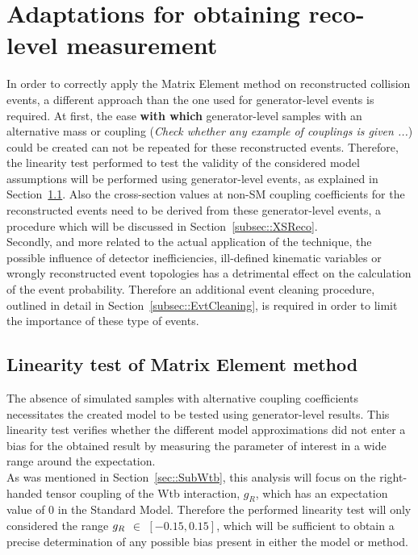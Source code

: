 \section{Adaptations for obtaining reco-level measurement} \label{sec::RecoAdapt}
In order to correctly apply the Matrix Element method on reconstructed collision events, a different approach than the one used for generator-level events is required.
At first, the ease \textbf{with which} generator-level samples with an alternative mass or coupling (\textit{Check whether any example of couplings is given ...}) could be created can not be repeated for these reconstructed events. Therefore, the linearity test performed to test the validity of the considered model assumptions will be performed using generator-level events, as explained in Section~\ref{subsec::CalibCurve}. Also the cross-section values at non-SM coupling coefficients for the reconstructed events need to be derived from these generator-level events, a procedure which will be discussed in Section~\ref{subsec::XSReco}.
\\
Secondly, and more related to the actual application of the technique, the possible influence of detector inefficiencies, ill-defined kinematic variables or wrongly reconstructed event topologies has a detrimental effect on the calculation of the event probability. 
Therefore an additional event cleaning procedure, outlined in detail in Section~\ref{subsec::EvtCleaning}, is required in order to limit the importance of these type of events. 

\subsection{Linearity test of Matrix Element method}\label{subsec::CalibCurve}

The absence of simulated samples with alternative coupling coefficients necessitates the created model to be tested using generator-level results. This linearity test verifies whether the different model approximations did not enter a bias for the obtained result by measuring the parameter of interest in a wide range around the expectation.
\\
As was mentioned in Section~\ref{sec::SubWtb}, this analysis will focus on the right-handed tensor coupling of the Wtb interaction, $g_{R}$, which has an expectation value of $0$ in the Standard Model. Therefore the performed linearity test will only considered the range $g_{R}$ $\in$ $\left[-0.15, 0.15\right]$, which will be sufficient to obtain a precise determination of any possible bias present in either the model or method.
\\

